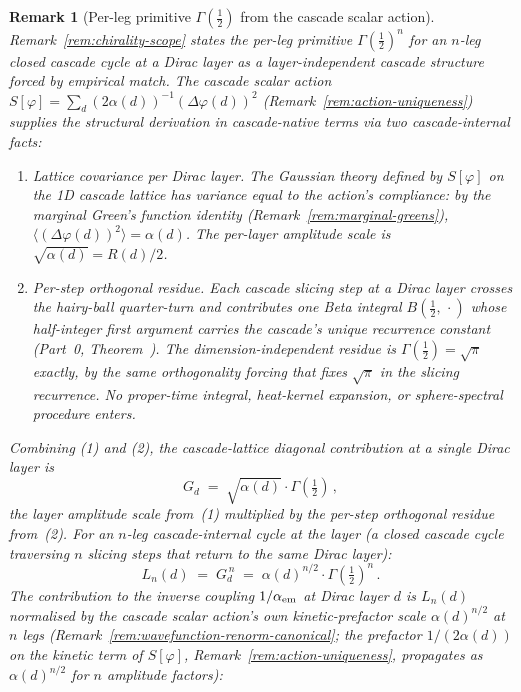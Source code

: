 \documentclass[12pt,a4paper]{article}
\newtheorem*{remark}{Remark}
\begin{document}
\begin{remark}[Per-leg primitive $\Gamma(\tfrac{1}{2})$ from the cascade scalar action]\label{rem:per-leg-primitive-derivation}
Remark~\ref{rem:chirality-scope} states the per-leg primitive $\Gamma(\tfrac{1}{2})^n$ for an $n$-leg closed cascade cycle at a Dirac layer as a layer-independent cascade structure forced by empirical match. The cascade scalar action $S[\varphi] = \sum_d (2\alpha(d))^{-1}(\Delta\varphi(d))^2$ (Remark~\ref{rem:action-uniqueness}) supplies the structural derivation in cascade-native terms via two cascade-internal facts:
\begin{enumerate}[label=(\arabic*),nosep]
\item \emph{Lattice covariance per Dirac layer.} The Gaussian theory defined by $S[\varphi]$ on the 1D cascade lattice has variance equal to the action's compliance: by the marginal Green's function identity (Remark~\ref{rem:marginal-greens}), $\langle(\Delta\varphi(d))^2\rangle = \alpha(d)$. The per-layer amplitude scale is $\sqrt{\alpha(d)} = R(d)/2$.
\item \emph{Per-step orthogonal residue.} Each cascade slicing step at a Dirac layer crosses the hairy-ball quarter-turn and contributes one Beta integral $B(\tfrac{1}{2},\,\cdot)$ whose half-integer first argument carries the cascade's unique recurrence constant (Part~0, Theorem~). The dimension-independent residue is $\Gamma(\tfrac{1}{2}) = \sqrt{\pi}$ exactly, by the same orthogonality forcing that fixes $\sqrt{\pi}$ in the slicing recurrence. No proper-time integral, heat-kernel expansion, or sphere-spectral procedure enters.
\end{enumerate}
Combining (1) and (2), the cascade-lattice diagonal contribution at a single Dirac layer is
\[
G_d \;=\; \sqrt{\alpha(d)}\cdot\Gamma(\tfrac{1}{2})\,,
\]
the layer amplitude scale from~(1) multiplied by the per-step orthogonal residue from~(2). For an $n$-leg cascade-internal cycle at the layer (a closed cascade cycle traversing $n$ slicing steps that return to the same Dirac layer):
\[
L_n(d) \;=\; G_d^{\,n} \;=\; \alpha(d)^{n/2}\cdot\Gamma(\tfrac{1}{2})^n\,.
\]
The contribution to the inverse coupling $1/\alpha_{\rm em}$ at Dirac layer $d$ is $L_n(d)$ normalised by the cascade scalar action's own kinetic-prefactor scale $\alpha(d)^{n/2}$ at $n$ legs (Remark~\ref{rem:wavefunction-renorm-canonical}; the prefactor $1/(2\alpha(d))$ on the kinetic term of $S[\varphi]$, Remark~\ref{rem:action-uniqueness}, propagates as $\alpha(d)^{n/2}$ for $n$ amplitude factors):
\[
\]
\end{remark}
\end{document}
